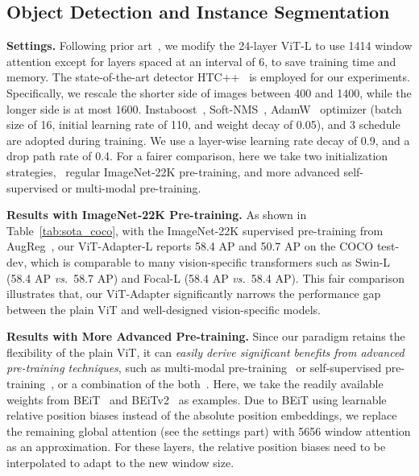 \documentclass{article} \usepackage{iclr2023_conference,times}
\begin{document}
\subsection{Object Detection and Instance Segmentation}
\label{sec:appendix_detection}

\noindent \textbf{Settings.}
Following prior art~\citep{li2021benchmarking}, we modify the 24-layer ViT-L to use 1414 window attention except for layers spaced at an interval of 6, to save training time and memory. 
The state-of-the-art detector HTC++~\citep{liu2021swin} is employed for our experiments.
Specifically, we rescale the shorter side of images between 400 and 1400, while the longer side is at most 1600. Instaboost~\citep{fang2019instaboost}, Soft-NMS~\citep{bodla2017soft}, AdamW~\citep{loshchilov2017decoupled} optimizer
(batch size of 16, initial learning rate of 110, and weight decay of 0.05), and 3 schedule are adopted during training.
We use a layer-wise learning rate decay of 0.9, and a drop path rate of 0.4. 
For a fairer comparison, here we take two initialization strategies, \ie~regular ImageNet-22K pre-training, and more advanced self-supervised or multi-modal pre-training.


\noindent \textbf{Results with ImageNet-22K Pre-training.}
As shown in Table~\ref{tab:sota_coco}, 
with the ImageNet-22K supervised pre-training from AugReg~\citep{steiner2021train},
our ViT-Adapter-L reports 58.4 AP and 50.7 AP on the COCO test-dev, which is
comparable to many vision-specific transformers such as Swin-L (58.4 AP \emph{vs.}~58.7 AP) and Focal-L (58.4 AP \emph{vs.}~58.4 AP).
This fair comparison illustrates that, our ViT-Adapter significantly narrows the performance gap between the plain ViT and well-designed vision-specific models. 



\noindent \textbf{Results with More Advanced Pre-training.}
Since our paradigm retains the flexibility of the plain ViT, it can \emph{easily derive significant benefits from advanced pre-training techniques}, such as multi-modal pre-training~\citep{zhu2021uni,zhu2022uni} or self-supervised pre-training~\citep{bao2021beit,peng2022beitv2,he2021masked}, or a combination of the both~\citep{wang2022beit3}.
Here, we take the readily available weights from BEiT~\citep{bao2021beit} and BEiTv2~\citep{bao2021beit} as examples. 
Due to BEiT using learnable relative position biases instead of the absolute position embeddings, we replace the remaining global attention (see the settings part) with 5656 window attention as an approximation.
For these layers, the relative position biases need to be interpolated to adapt to the new window size.
\end{document}
